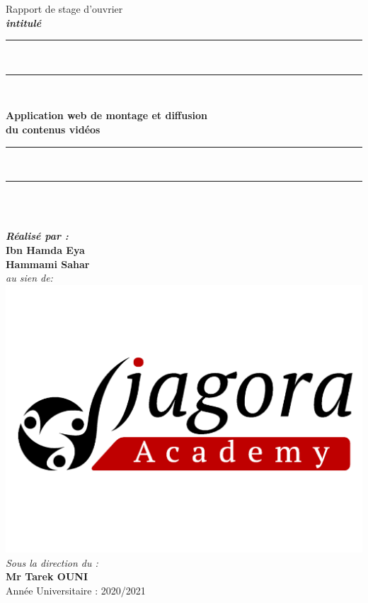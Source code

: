 \begin{titlepage}
\begin{center}
\vspace{30pt}
{%
  \renewcommand*{\familydefault}{\defaultFont}
  \fontsize{34pt}{34pt}\selectfont%
  Rapport de stage d’ouvrier
}\\
\vspace{12pt} {%
  \fontsize{13pt}{13pt}\selectfont%
  \textbf{\textit{intitulé}}\\
}%
\vspace{12pt} {%
  \begin{spacing}{0.05}
    \rule{200pt}{2pt}\\
    \rule{200pt}{0.75pt}\\
  \end{spacing}
  \renewcommand*{\familydefault}{\defaultFont}
  \fontsize{17pt}{17pt}\selectfont%
  \vspace{20pt}
  \textbf{
Application web de montage et diffusion\\ du contenus vidéos
  \\%
  }
  \vspace{20pt}
  \begin{spacing}{0.05}
    \rule{200pt}{0.75pt}\\
    \rule{200pt}{2pt}\\
  \end{spacing}
}
\vspace{20pt}
\textbf{\textit{}}\\
\vspace{3pt} {%
  \fontsize{13pt}{13pt}\selectfont%
  \textbf{\textit{Réalisé par :}}\\
  \textbf{Ibn Hamda Eya}\\
  \textbf{Hammami Sahar}\\
  \textit{au sien de:}\\
    \includegraphics{images/djagoralogo.png}
}%
\vspace{20pt} {%
\\
  \fontsize{15pt}{15pt}\selectfont%
  \textit{Sous la direction du :}\\
  \textbf{Mr Tarek OUNI}\\
  Année Universitaire : 2020/2021
}%
\vfill
\end{center}
\end{titlepage}